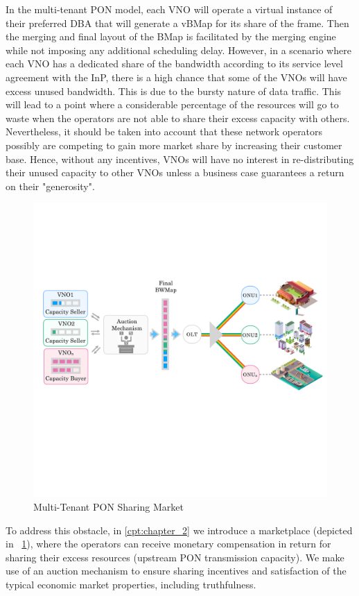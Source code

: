 In the multi-tenant \ac{PON} model, each \ac{VNO} will operate a virtual instance of their preferred \ac{DBA} that will generate a \ac{vBMap} for its share of the frame. Then the merging and final layout of the \ac{BMap} is facilitated by the merging engine while not imposing any additional scheduling delay. However, in a scenario where each \ac{VNO} has a dedicated share of the bandwidth according to its service level agreement with the \ac{InP}, there is a high chance that some of the \acp{VNO} will have excess unused bandwidth. This is due to the bursty nature of data traffic. This will lead to a point where a considerable percentage of the resources will go to waste when the operators are not able to share their excess capacity with others. 
Nevertheless, it should be taken into account that these network operators possibly are competing to gain more market share by increasing their customer base. Hence, without any incentives, \acp{VNO} will have no interest in re-distributing their unused capacity to other \acp{VNO} unless a business case guarantees a return on their "generosity". 
\begin{figure}
\centering
\includegraphics[width=\linewidth]{Figures/pon_new.pdf}
\caption{Multi-Tenant PON Sharing Market}
\label{market-fig-intro}
\end{figure}
To address this obstacle, in \autoref{cpt:chapter_2} we introduce a marketplace (depicted in \figureautorefname~\ref{market-fig-intro}), where the operators can receive monetary compensation in return for sharing their excess resources (upstream PON transmission capacity). We make use of an auction mechanism to ensure sharing incentives and satisfaction of the typical economic market properties, including truthfulness.
